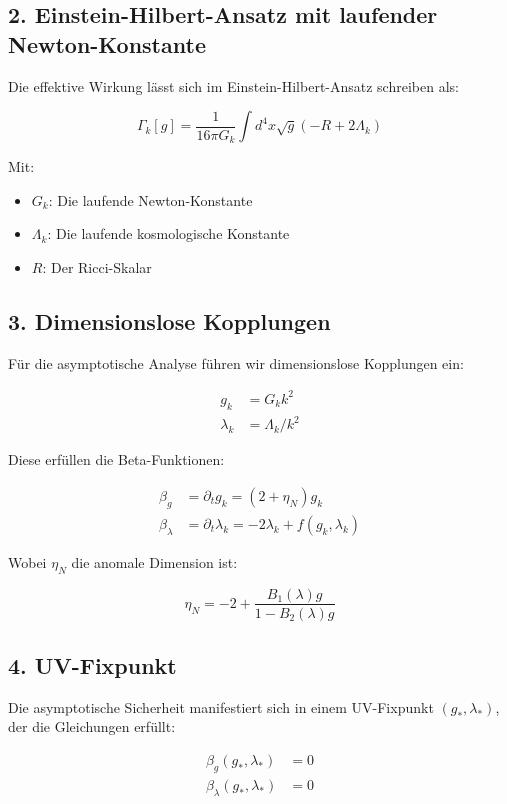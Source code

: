 \documentclass{article}
\begin{document}
\subsection{2. Einstein-Hilbert-Ansatz mit laufender Newton-Konstante}

Die effektive Wirkung lässt sich im Einstein-Hilbert-Ansatz schreiben als:

\[
\Gamma_k[g] = \frac{1}{16\pi G_k} \int d^4x \sqrt{g} \left(-R + 2\Lambda_k\right)
\]

Mit:

\begin{itemize}
	\item $G_k$: Die laufende Newton-Konstante
	\item $\Lambda_k$: Die laufende kosmologische Konstante
	\item $R$: Der Ricci-Skalar
\end{itemize}

\subsection{3. Dimensionslose Kopplungen}

Für die asymptotische Analyse führen wir dimensionslose Kopplungen ein:

\begin{align*}
	g_k &= G_k k^2 \\
	\lambda_k &= \Lambda_k/k^2
\end{align*}

Diese erfüllen die Beta-Funktionen:

\begin{align*}
	\beta_g &= \partial_t g_k = (2 + \eta_N)g_k \\
	\beta_\lambda &= \partial_t \lambda_k = -2\lambda_k + f(g_k,\lambda_k)
\end{align*}

Wobei $\eta_N$ die anomale Dimension ist:

\[
\eta_N = -2 + \frac{B_1(\lambda)g}{1 - B_2(\lambda)g}
\]

\subsection{4. UV-Fixpunkt}

Die asymptotische Sicherheit manifestiert sich in einem UV-Fixpunkt $(g_*,\lambda_*)$, der die Gleichungen erfüllt:

\begin{align*}
	\beta_g(g_*,\lambda_*) &= 0 \\
	\beta_\lambda(g_*,\lambda_*) &= 0
\end{align*}
\end{document}
